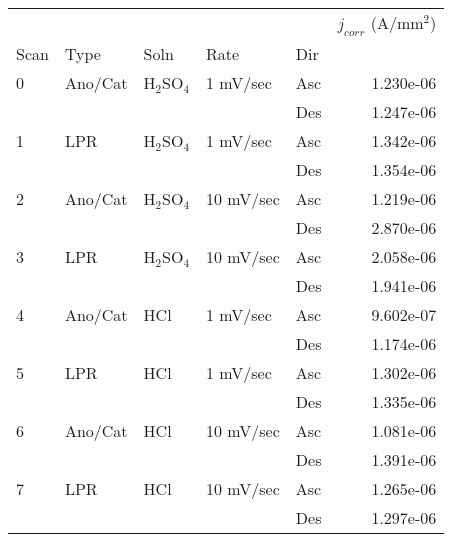 \begin{tabular}{lllllr}
\toprule
  &     &     &           &     &  $j_{corr}$ (A/mm$^2$) \\
Scan & Type & Soln & Rate & Dir &                        \\
\midrule
0 & Ano/Cat & H$_2$SO$_4$ & 1 mV/sec & Asc &              1.230e-06 \\
  &     &     &           & Des &              1.247e-06 \\
1 & LPR & H$_2$SO$_4$ & 1 mV/sec & Asc &              1.342e-06 \\
  &     &     &           & Des &              1.354e-06 \\
2 & Ano/Cat & H$_2$SO$_4$ & 10 mV/sec & Asc &              1.219e-06 \\
  &     &     &           & Des &              2.870e-06 \\
3 & LPR & H$_2$SO$_4$ & 10 mV/sec & Asc &              2.058e-06 \\
  &     &     &           & Des &              1.941e-06 \\
4 & Ano/Cat & HCl & 1 mV/sec & Asc &              9.602e-07 \\
  &     &     &           & Des &              1.174e-06 \\
5 & LPR & HCl & 1 mV/sec & Asc &              1.302e-06 \\
  &     &     &           & Des &              1.335e-06 \\
6 & Ano/Cat & HCl & 10 mV/sec & Asc &              1.081e-06 \\
  &     &     &           & Des &              1.391e-06 \\
7 & LPR & HCl & 10 mV/sec & Asc &              1.265e-06 \\
  &     &     &           & Des &              1.297e-06 \\
\bottomrule
\end{tabular}
